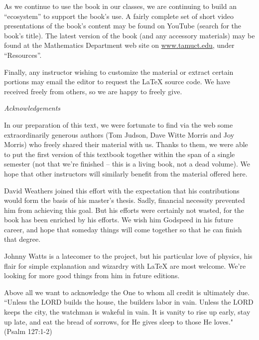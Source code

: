 As we continue to use the book in our classes, we are continuing to build an ``ecosystem''  to support the book's use. A fairly complete set of short video presentations of the book's content may be found on YouTube (search for the book's title). The latest version of the book (and any accessory materials) may be found at the Mathematics Department web site on 
\url{www.tamuct.edu}, under ``Resources''.

Finally, any instructor wishing to customize the material or extract certain portions may email the editor to request the LaTeX source code. We have received freely from others, so we are happy to freely give.


\medskip

\noindent
\emph{Acknowledgements}
\smallskip

In our preparation of this text, we were fortunate to find via the web  some extraordinarily generous authors (Tom Judson, Dave Witte Morris and Joy Morris) who freely shared their material with us. Thanks to them, we were able to put the first version of this  textbook together within the span of a single semester (not that we're finished -- this is a living book, not a dead volume). We hope that other instructors will similarly benefit from the material offered here.  

David Weathers joined this effort
with the expectation that his contributions would form the basis of his master's thesis. Sadly, financial necessity prevented him from achieving this goal. But his efforts were certainly not wasted, for the book has been enriched by his efforts. We wish him Godspeed in his future career, and hope that someday things will come together so that he can finish that degree. 

Johnny Watts is a latecomer to the project,  but his particular love of physics, his flair for simple explanation and wizardry with LaTeX are most welcome.  We're looking for more good things from him in future editions.
\medskip 

Above all we want to acknowledge the One to whom all credit is ultimately due. ``Unless the LORD builds the house, the builders labor in vain. Unless the LORD keeps the city, the watchman is wakeful in vain.  It is vanity to rise up early, stay up late, and eat the bread of sorrows, for He gives sleep to those He loves."  (Psalm 127:1-2)

